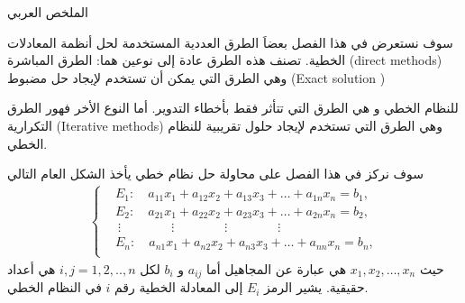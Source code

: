 
{ \huge الملخص العربي   } \\
\vskip1.0in

سوف نستعرض في هذا الفصل بعضاَ الطرق العددية المستخدمة لحل أنظمة المعادلات الخطية. تصنف هذه الطرق عادة  إلى نوعين هما: الطرق المباشرة
(\textenglish{direct methods})
وهي الطرق التي يمكن أن تستخدم لإيجاد حل مضبوط
(\textenglish{Exact solution })

 للنظام الخطي و هي الطرق التي تتأثر فقط بأخطاء التدوير.  أما النوع الأخر فهور الطرق التكرارية
  (\textenglish{Iterative methods}) وهي الطرق التي تستخدم لإيجاد حلول تقريبية للنظام الخطي.

سوف نركز في هذا الفصل على محاولة حل نظام خطي يأخذ الشكل العام التالي
\begin{align}
\begin{cases} \label{eqn:Linear:General.system}
&E_1 : \quad a_{1 1} x_1 + a_{1 2} x_2 + a_{1 3} x_3 + \hdots+a_{1 n} x_n  =  b_1, \\
&E_2 : \quad a_{2 1} x_1 + a_{2 2} x_2 + a_{2 3} x_3 + \hdots+a_{2 n} x_n  =  b_2, \\
&\:\vdots \quad \quad \quad \quad \vdots\quad \quad \quad \quad \vdots\quad \quad \quad \quad \vdots \\
&E_n : \quad a_{n 1} x_1 + a_{n 2} x_2 + a_{n 3} x_3 + \hdots+a_{n n} x_n  =  b_n, \\
\end{cases}
\end{align}
حيث $x_1, x_2, \hdots,x_n$ هي عبارة عن المجاهيل أما $a_{i j}$  و $b_i$ لكل $i, j =1,2,..,n$ هي أعداد حقيقية. يشير الرمز $E_i$ إلى المعادلة الخطية رقم $i$ في النظام الخطي.
